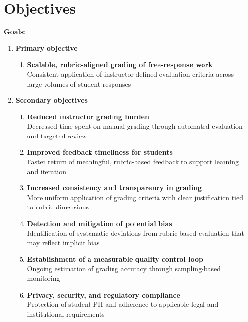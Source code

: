 \documentclass[11pt]{article}
\begin{document}
\section{Objectives}
\textbf{Goals:}
\begin{enumerate}[leftmargin=*]
    \item \textbf{Primary objective}
    \begin{enumerate}
        \item \textbf{Scalable, rubric-aligned grading of free-response work} \\
        Consistent application of instructor-defined evaluation criteria across large volumes of student responses
    \end{enumerate}

    \item \textbf{Secondary objectives}
    \begin{enumerate}
        \item \textbf{Reduced instructor grading burden} \\
        Decreased time spent on manual grading through automated evaluation and targeted review

        \item \textbf{Improved feedback timeliness for students} \\
        Faster return of meaningful, rubric-based feedback to support learning and iteration

        \item \textbf{Increased consistency and transparency in grading} \\
        More uniform application of grading criteria with clear justification tied to rubric dimensions

        \item \textbf{Detection and mitigation of potential bias} \\
        Identification of systematic deviations from rubric-based evaluation that may reflect implicit bias

        \item \textbf{Establishment of a measurable quality control loop} \\
        Ongoing estimation of grading accuracy through sampling-based monitoring

        \item \textbf{Privacy, security, and regulatory compliance} \\
        Protection of student PII and adherence to applicable legal and institutional requirements
    \end{enumerate}
\end{enumerate}
\end{document}
